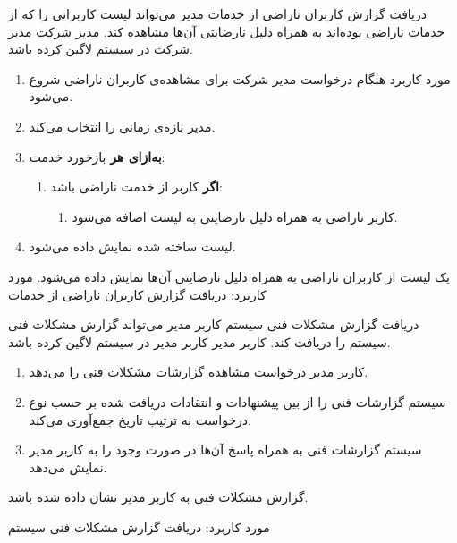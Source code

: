 {
\usecase
{دریافت گزارش کاربران ناراضی از خدمات}
{}
{مدیر می‌تواند لیست کاربرانی را که از خدمات ناراضی بوده‌اند به همراه دلیل نارضایتی آن‌ها مشاهده کند.}
{مدیر شرکت}
{}
{مدیر شرکت در سیستم لاگین کرده باشد.}
{
	\vspace*{-0.6cm}
	\begin{enumerate}
		\item 
		مورد کاربرد هنگام درخواست مدیر شرکت برای مشاهده‌ی کاربران ناراضی شروع می‌شود.
		\item
		مدیر بازه‌ی زمانی را انتخاب می‌کند.
		\item
		\textbf{به‌ازای هر} بازخورد خدمت:
		\begin{enumerate}[label=\theenumi.\arabic*.]
			\item 
			\textbf{اگر} کاربر از خدمت ناراضی باشد:
			\begin{enumerate}
				\item 
				کاربر ناراضی به همراه دلیل نارضایتی به لیست اضافه می‌شود.
			\end{enumerate}
		\end{enumerate}
		\item
		لیست ساخته شده نمایش داده می‌شود.
	\end{enumerate}
}
{یک لیست از کاربران ناراضی به همراه دلیل نارضایتی آن‌ها نمایش داده می‌شود.}
{
}
{
مورد کاربرد: دریافت گزارش کاربران ناراضی از خدمات
}
}

{
	\usecase
	{دریافت گزارش مشکلات فنی سیستم}
	{}
	{کاربر مدیر می‌تواند گزارش مشکلات فنی سیستم را دریافت کند.}
	{کاربر مدیر}
	{}
	{کاربر مدیر در سیستم لاگین کرده باشد.}
	{
		\vspace*{-0.6cm}
		\begin{enumerate}
			\item 
کاربر مدیر درخواست مشاهده گزارشات مشکلات فنی را می‌دهد.
			\item
سیستم گزارشات فنی را از بین پیشنهادات و انتقادات دریافت شده بر حسب نوع درخواست به ترتیب تاریخ جمع‌آوری می‌کند.
			\item
سیستم گزارشات فنی به همراه پاسخ‌ آن‌ها در صورت وجود را به کاربر مدیر نمایش می‌دهد.
		\end{enumerate}
	}
	{
گزارش مشکلات فنی به کاربر مدیر نشان داده شده باشد.	
}
	{

	}
	{
	مورد کاربرد:	دریافت گزارش مشکلات فنی سیستم
	}

}


